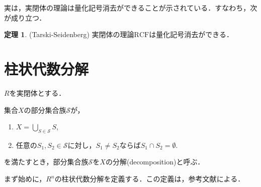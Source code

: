 \documentclass[uplatex, dvipdfmx]{jsarticle}
\newcommand{\Qua}{\mathfrak{Q}}
\newcommand{\calS}{\mathcal{S}}
\newcommand{\RCF}{\mathrm{RCF}}
\theoremstyle{definition}
\newtheorem{theorem}{定理}[section]
\begin{document}
実は，実閉体の理論は量化記号消去ができることが示されている．すなわち，次が成り立つ．

\begin{theorem}(Tarski-Seidenberg)
     実閉体の理論$\RCF$は量化記号消去ができる．
\end{theorem}




\section{柱状代数分解}

$R$を実閉体とする．

集合$X$の部分集合族$\calS$が，
\begin{enumerate}
     \item $X = \bigcup_{S \in \calS} S$,
     \item 任意の$S_1, S_2 \in \calS$に対し，$S_1 \neq S_2$ならば$S_1 \cap S_2 = \emptyset$.
\end{enumerate}
を満たすとき，部分集合族$\calS$を$X$の分解(decomposition)と呼ぶ．

まず始めに，$R^n$の柱状代数分解を定義する．この定義は，参考文献\cite{Basu}による．
\end{document}
